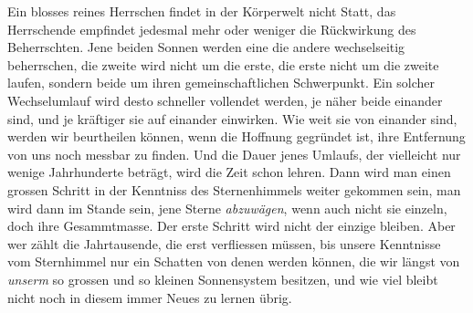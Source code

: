 Ein blosses reines Herrschen findet in der Körperwelt nicht Statt, das Herrschende empfindet jedesmal mehr oder weniger die Rückwirkung des Beherrschten. Jene beiden Sonnen werden eine die andere wechselseitig beherrschen, die zweite wird nicht um die erste, die erste nicht um die zweite laufen, sondern beide um ihren gemeinschaftlichen Schwerpunkt. Ein solcher Wechselumlauf wird desto schneller vollendet werden, je näher beide einander sind, und je kräftiger sie auf einander einwirken. Wie weit sie von einander sind, werden wir beurtheilen können, wenn die Hoffnung gegründet ist, ihre Entfernung von uns noch messbar zu finden. Und die Dauer jenes Umlaufs, der vielleicht nur wenige Jahrhunderte beträgt, wird die Zeit schon lehren. Dann wird man einen grossen Schritt in der Kenntniss des Sternenhimmels weiter gekommen sein, man wird dann im Stande sein, jene Sterne \emph{abzuwägen}, wenn auch nicht sie einzeln, doch ihre Gesammtmasse. Der erste Schritt wird nicht der einzige bleiben. Aber wer zählt die Jahrtausende, die erst verfliessen müssen, bis unsere Kenntnisse vom Sternhimmel nur ein Schatten von denen werden können, die wir längst von \emph{unserm} so grossen und so kleinen Sonnensystem besitzen, und wie viel bleibt nicht noch in diesem immer Neues zu lernen übrig.
